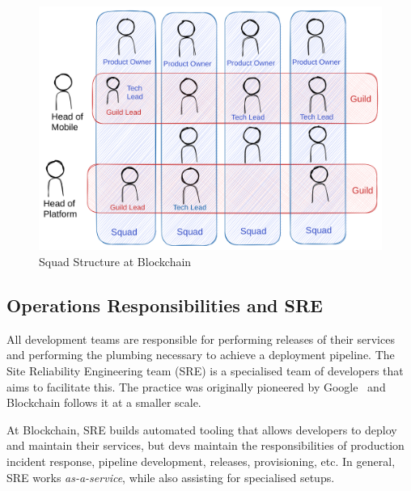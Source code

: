 \documentclass[conference]{IEEEtran}
\begin{document}

    \begin{figure}[h]
        \centering
        \includegraphics[width=0.94\columnwidth]{bcSquads}
        \caption{Squad Structure at Blockchain}
        \label{fig:squad}
    \end{figure}

    \subsection{Operations Responsibilities and SRE}

    All development teams are responsible for performing releases of their services and performing the plumbing necessary to achieve a deployment pipeline.
    The Site Reliability Engineering team (SRE) is a specialised team of developers that aims to facilitate this.
    The practice was originally pioneered by Google~\cite{googleSreIntro} and Blockchain follows it at a smaller scale.

    At Blockchain, SRE builds automated tooling that allows developers to deploy and maintain their services, but devs maintain the responsibilities of production incident response, pipeline development, releases, provisioning, etc.
    In general, SRE works \emph{as-a-service}, while also assisting for specialised setups.
\end{document}
